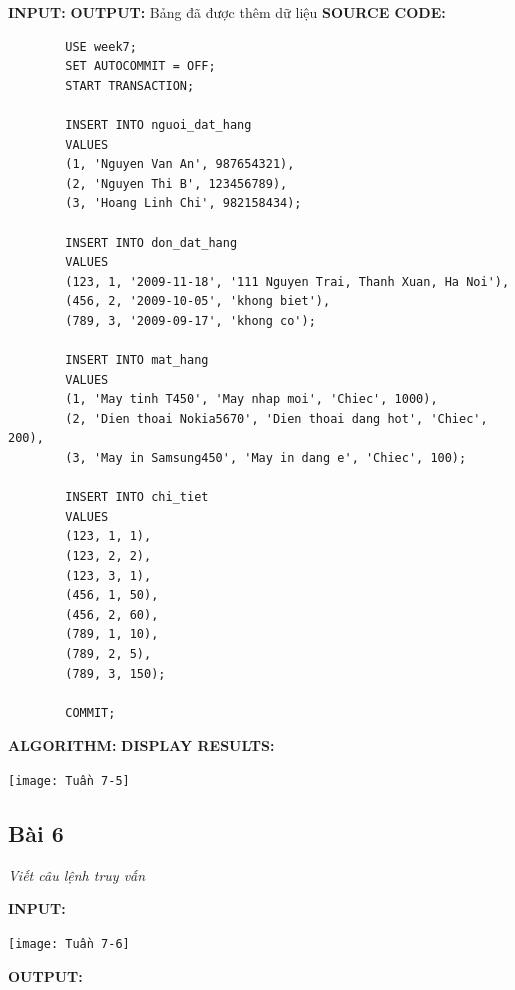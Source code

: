 \documentclass[12pt,a4paper]{report}
\begin{document}
	{\bf INPUT:}
	{\bf OUTPUT:} Bảng đã được thêm dữ liệu
	{\bf SOURCE CODE:}
	\begin{lstlisting}
		USE week7;
		SET AUTOCOMMIT = OFF;
		START TRANSACTION;

		INSERT INTO nguoi_dat_hang
		VALUES
		(1, 'Nguyen Van An', 987654321),
		(2, 'Nguyen Thi B', 123456789),
		(3, 'Hoang Linh Chi', 982158434);

		INSERT INTO don_dat_hang
		VALUES 
		(123, 1, '2009-11-18', '111 Nguyen Trai, Thanh Xuan, Ha Noi'),
		(456, 2, '2009-10-05', 'khong biet'),
		(789, 3, '2009-09-17', 'khong co');

		INSERT INTO mat_hang
		VALUES
		(1, 'May tinh T450', 'May nhap moi', 'Chiec', 1000),
		(2, 'Dien thoai Nokia5670', 'Dien thoai dang hot', 'Chiec', 200),
		(3, 'May in Samsung450', 'May in dang e', 'Chiec', 100);

		INSERT INTO chi_tiet
		VALUES
		(123, 1, 1),
		(123, 2, 2),
		(123, 3, 1),
		(456, 1, 50),
		(456, 2, 60),
		(789, 1, 10),
		(789, 2, 5),
		(789, 3, 150);

		COMMIT;
	\end{lstlisting}
	{\bf ALGORITHM:}
	{\bf DISPLAY RESULTS:}
		\begin{center}
			\texttt{[image: Tuần 7-5]}
		\end{center}
\subsection{Bài 6}
	\begin{center}
		{\it Viết câu lệnh truy vấn}
	\end{center}
	
	{\bf INPUT:}
		\begin{center}
			\texttt{[image: Tuần 7-6]}
		\end{center}
	{\bf OUTPUT:}
	
\end{document}

